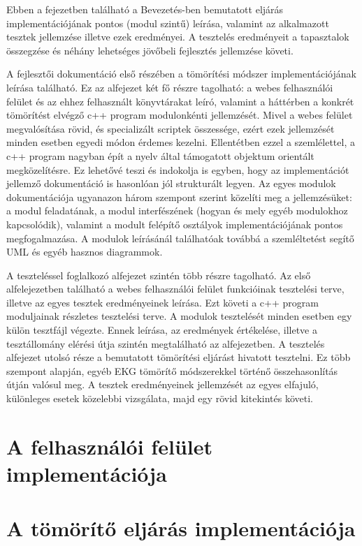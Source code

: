 \documentclass[oneside,titlepage,12pt,a4paper]{report}
\begin{document}
Ebben a fejezetben található a Bevezetés-ben bemutatott eljárás implementációjának pontos (modul szintű) leírása, valamint az alkalmazott tesztek jellemzése illetve ezek eredményei. A tesztelés eredményeit a tapasztalok összegzése és néhány lehetséges jövőbeli fejlesztés jellemzése követi. \par A fejlesztői dokumentáció első részében a tömörítési módszer implementációjának leírása található. Ez az alfejezet két fő részre tagolható: a webes felhasználói felület és az ehhez felhasznált könyvtárakat leíró, valamint a háttérben a konkrét tömörítést elvégző c++ program modulonkénti jellemzését. Mivel a webes felület megvalósítása rövid, és specializált scriptek összessége, ezért ezek jellemzését minden esetben egyedi módon érdemes kezelni. Ellentétben ezzel a szemlélettel, a c++ program nagyban épít a nyelv által támogatott objektum orientált megközelítésre. Ez lehetővé teszi és indokolja is egyben, hogy az implementációt jellemző dokumentáció is hasonlóan jól strukturált legyen. Az egyes modulok dokumentációja ugyanazon három szempont szerint közelíti meg a jellemzésüket: a modul feladatának, a modul interfészének (hogyan és mely egyéb modulokhoz kapcsolódik), valamint a modult felépítő osztályok implementációjának pontos megfogalmazása. A modulok leírásánál találhatóak továbbá a szemléltetést segítő UML és egyéb hasznos diagrammok. 
\par  A teszteléssel foglalkozó alfejezet szintén több részre tagolható. Az első alfelejezetben található a webes felhasználói felület funkcióinak tesztelési terve, illetve az egyes tesztek eredményeinek leírása. Ezt követi a c++ program moduljainak részletes tesztelési terve. A modulok tesztelését minden esetben egy külön tesztfájl végezte. Ennek leírása, az eredmények értékelése, illetve a tesztállomány elérési útja szintén megtalálható az alfejezetben. A  tesztelés alfejezet utolsó része a bemutatott tömörítési eljárást hivatott tesztelni. Ez több szempont alapján, egyéb EKG tömörítő módszerekkel történő összehasonlítás útján valósul meg. A tesztek eredményeinek jellemzését az egyes elfajuló, különleges esetek közelebbi vizsgálata, majd egy rövid kitekintés követi.

\section{A felhasználói felület implementációja}

\section{A tömörítő eljárás implementációja}
\end{document}
